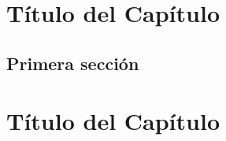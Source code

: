 \documentclass[12pt,a4paper,oneside,]{book}
\def\ifdoblecara{} %
\let\ifdoblecara\undefined %
\def\ifprincipal{} %
\numberwithin{dummy}{section}
\theoremstyle{ocrenumbox}
\theoremstyle{blacknumex}
\theoremstyle{blacknumbox}
\theoremstyle{ocrenum}
\theoremstyle{ocrenum}
\begin{document}
\renewcommand{\headrulewidth}{0.4pt}
\renewcommand{\footrulewidth}{0.4pt}

\ifdefined\ifprincipal
\else
\setlength{\parindent}{1em}
\pagestyle{fancy}
\setcounter{tocdepth}{4}
\tableofcontents

\nocite{Luque2017,Luque2019,RStudio,R-base2,
R-knitr,R-rmarkdown,R-dplyr,R-ggplot2,Techopedia}

\fi

\ifdefined\ifdoblecara
\fancyhead{}{}
\fancyhead[LE,RO]{\scriptsize\rightmark}
\fancyfoot[LO,RE]{\scriptsize\slshape \leftmark}
\fancyfoot[C]{}
\fancyfoot[LE,RO]{\footnotesize\thepage}
\else
\fancyhead{}{}
\fancyhead[RO]{\scriptsize\rightmark}
\fancyfoot[LO]{\scriptsize\slshape \leftmark}
\fancyfoot[C]{}
\fancyfoot[RO]{\footnotesize\thepage}
\fi

\renewcommand{\headrulewidth}{0.4pt}
\renewcommand{\footrulewidth}{0.4pt}

\hypertarget{tuxedtulo-del-capuxedtulo}{%
\chapter{Título del Capítulo}\label{tuxedtulo-del-capuxedtulo}}

\hypertarget{primera-secciuxf3n}{%
\section{Primera sección}\label{primera-secciuxf3n}}

\FloatBarrier

\ifdefined\ifprincipal
\else
\setlength{\parindent}{1em}
\pagestyle{fancy}
\setcounter{tocdepth}{4}
\tableofcontents

\nocite{Luque2017,Luque2019,RStudio,R-base2,
R-knitr,R-rmarkdown,R-dplyr,R-ggplot2,Techopedia}

\fi

\ifdefined\ifdoblecara
\fancyhead{}{}
\fancyhead[LE,RO]{\scriptsize\rightmark}
\fancyfoot[LO,RE]{\scriptsize\slshape \leftmark}
\fancyfoot[C]{}
\fancyfoot[LE,RO]{\footnotesize\thepage}
\else
\fancyhead{}{}
\fancyhead[RO]{\scriptsize\rightmark}
\fancyfoot[LO]{\scriptsize\slshape \leftmark}
\fancyfoot[C]{}
\fancyfoot[RO]{\footnotesize\thepage}
\fi

\renewcommand{\headrulewidth}{0.4pt}
\renewcommand{\footrulewidth}{0.4pt}

\hypertarget{tuxedtulo-del-capuxedtulo-1}{%
\chapter{Título del Capítulo}\label{tuxedtulo-del-capuxedtulo-1}}
\end{document}
